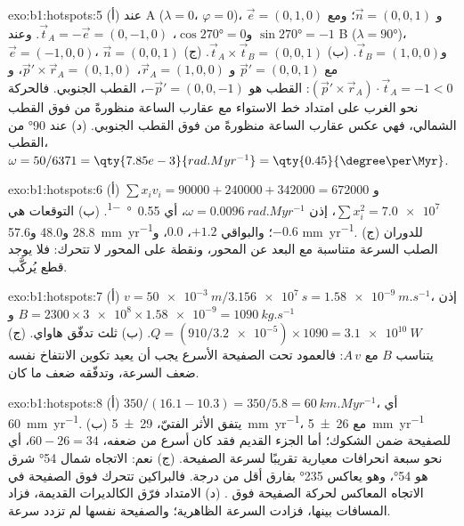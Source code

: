 \begin{solution}{exo:b1:hotspots:5}
(أ) عند A ($\lambda = 0$، $\varphi = 0$)، $\vec e = (0, 1, 0)$ و
$\vec n = (0, 0, 1)$؛ ومع $\sin\ang{270} = -1$ و$\cos\ang{270} = 0$،
$\vec t_A = -\vec e = (0, -1, 0)$. وعند B ($\lambda = \ang{90}$)،
$\vec e = (-1, 0, 0)$، $\vec n = (0, 0, 1)$ و$\vec t_B = (1, 0, 0)$. (ب) $\vec t_A\times\vec t_B = (0, 0, 1)$. (ج) مع $\vec p' = (0, 0, 1)$ و
$\vec r_A = (1, 0, 0)$، $\vec p'\times\vec r_A = (0, 1, 0)$، و
$(\vec p'\times\vec r_A)\cdot\vec t_A = -1 < 0$: القطب هو
$-\vec p' = (0, 0, -1)$، القطب الجنوبي. فالحركة نحو الغرب على امتداد خط الاستواء مع عقارب الساعة منظورةً من فوق القطب الشمالي، فهي عكس عقارب الساعة منظورةً من فوق القطب الجنوبي. (د) عند \ang{90} من القطب، $\omega = 50/6371 =
\qty{7.85e-3}{rad.Myr^{-1}} = \qty{0.45}{\degree\per\Myr}$.
\end{solution}

\begin{solution}{exo:b1:hotspots:6}
(أ) $\sum x_i v_i = 90000 + 240000 + 342000 = \num{672000}$ و
$\sum x_i^2 = \num{7.0e7}$، إذن $\omega = \qty{0.0096}{rad.Myr^{-1}}$، أي
\qty{0.55}{\degree\per\Myr}. (ب) التوقعات هي 28.8 و\num{48.0} و\qty{57.6}{mm.yr^{-1}}؛ والبواقي $+1.2$، $0.0$، و$-0.6$
\unit{mm.yr^{-1}}. (ج) للدوران الصلب السرعة متناسبة مع البعد عن المحور، ونقطة على المحور لا تتحرك: فلا يوجد قطع يُركَّب.
\end{solution}

\begin{solution}{exo:b1:hotspots:7}
(أ) $v = \qty{50e-3}{m}/\qty{3.156e7}{s} = \qty{1.58e-9}{m.s^{-1}}$، إذن
$B = 2300\times\num{3e8}\times\num{1.58e-9} = \qty{1090}{kg.s^{-1}}$ و
$Q = (910/\num{3.2e-5})\times1090 = \qty{3.1e10}{W}$. (ب) ثلث تدفّق هاواي. (ج) يتناسب $B$ مع $A\,v$: فالعمود تحت الصفيحة الأسرع يجب أن يعيد تكوين الانتفاخ نفسه ضعف السرعة، وتدفّقه ضعف ما كان.
\end{solution}

\begin{solution}{exo:b1:hotspots:8}
(أ) $350/(16.1 - 10.3) = 350/5.8 = \qty{60}{km.Myr^{-1}}$، أي
\qty{60}{mm.yr^{-1}}. (ب) يتفق الأثر الفتيّ، \qty{29 \pm 5}{mm.yr^{-1}}، مع \qty{26 \pm 5}{mm.yr^{-1}} للصفيحة ضمن الشكوك؛ أما الجزء القديم فقد كان أسرع من ضعفه، $60 - 26 = 34$، أي نحو سبعة انحرافات معيارية تقريبًا لسرعة الصفيحة. (ج) نعم: الاتجاه شمال \ang{54} شرق هو  \ang{54}، وهو يعاكس \ang{235} بفارق أقل من درجة. فالبراكين تتحرك فوق الصفيحة في الاتجاه المعاكس لحركة الصفيحة فوق . (د) الامتداد فرّق الكالديرات القديمة، فزاد المسافات بينها، فزادت السرعة الظاهرية؛ والصفيحة نفسها لم تزدد سرعة.
\end{solution}

